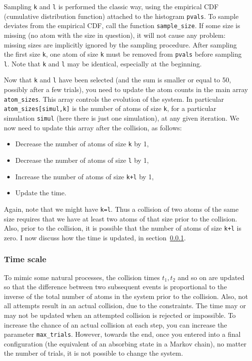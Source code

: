 \documentclass[oneside,10pt]{book}
\begin{document}
Sampling \texttt{k} and \texttt{l} is performed the classic way, using the empirical CDF (cumulative distribution function) attached to the histogram 
 \texttt{pvals}. To sample deviates from the empirical CDF, call the
 function \texttt{sample\_size}. If some size is missing (no atom with the size in question), it will not cause any problem: 
 missing sizes are implicitly ignored by the sampling procedure. After sampling the first size \texttt{k}, one atom of size 
\texttt{k} must be removed from \texttt{pvals} before sampling \texttt{l}. Note that \texttt{k} and \texttt{l} may be identical, especially at the beginning.   

Now that \texttt{k} and \texttt{l} have been selected (and the sum is smaller or equal to 50, possibly after a few trials), you need to update the atom counts in the main array \texttt{atom\_sizes}. This array controls the evolution of the system. In particular \texttt{atom\_sizes[simul,k]} is the number of atoms of size \texttt{k}, for a particular simulation 
\texttt{simul} (here there is just one simulation),
 at any given iteration. We now need to update this array after the collision, as follows:\vspace{1ex}
\begin{itemize}
\item Decrease the number of atoms of size \texttt{k} by 1,
\item Decrease the number of atoms of size \texttt{l} by 1,
\item Increase the number of atoms of size \texttt{k+l} by 1,
\item Update the time.
\end{itemize}
Again, note that we might have \texttt{k=l}. Thus a collision of two atoms of the same size requires that we have at least two atoms of that size prior to the collision. Also, prior to the collision, it is possible that the number of 
atoms of size \texttt{k+l} is zero. I now discuss how the time is updated, in section~\ref{timul}.

\subsubsection{Time scale}\label{timul}

To mimic some natural processes, the collision times $t_1,t_2$ and so on are updated so that the difference between two 
 subsequent events is proportional to the inverse of the total number of atoms in the system prior to the collision. 
Also, not all attempts result in an actual collision, due to the constraints. The time may or may not be updated when
 an attempted collision is rejected or impossible. To increase the chance of an actual collision at each step, you
 can increase the parameter \texttt{max\_trials}. However, towards the end, once you entered into a final configuration 
 (the equivalent of an absorbing state in a Markov chain), no matter the number of trials, it is not possible to change the system. 
\end{document}
